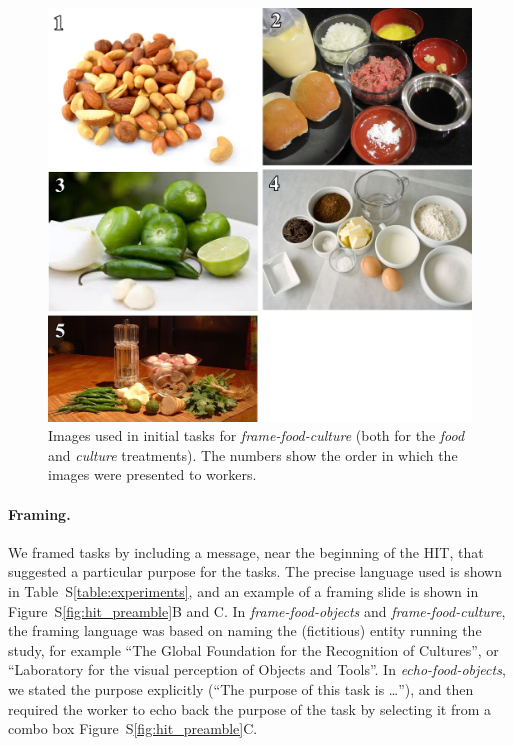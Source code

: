 \documentclass{sigchi}
\begin{document}
\begin{figure}
	\begin{center}
		\includegraphics{figs/task2-ingr.jpg}
	\end{center}
	\caption{
		Images used in initial tasks for \textit{frame-food-culture} 
		(both for the \textit{food} and \textit{culture} treatments).
		The numbers show the order in which the images were presented to 
		workers.
	}
	\label{fig:frame2:ingr}
\end{figure}

\paragraph{Framing.}
We framed tasks by including a message, near the beginning of the HIT, that 
suggested a particular purpose for the tasks.
The precise language used is shown in 
Table~S\ref{table:experiments}, and an example of a framing slide is shown in
Figure~S\ref{fig:hit_preamble}B and C.  In \textit{frame-food-objects}
and \textit{frame-food-culture}, the framing language was based on
naming the (fictitious) entity running the study, for example
``The Global Foundation for the Recognition of Cultures'',
or ``Laboratory for the visual perception of Objects and Tools''.
In \textit{echo-food-objects}, we stated the purpose explicitly 
(``The purpose of this task is \dots''), and then required the worker to
echo back the purpose of the task by selecting it from a combo box
Figure~S\ref{fig:hit_preamble}C.
\end{document}

